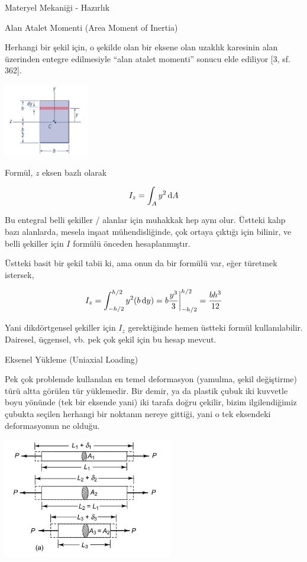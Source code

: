 \documentclass[12pt,fleqn]{article}\usepackage{../../common}
\begin{document}
Materyel Mekaniği - Hazırlık

Alan Atalet Momenti (Area Moment of Inertia)

Herhangi bir şekil için, o şekilde olan bir eksene olan uzaklık karesinin alan
üzerinden entegre edilmesiyle ``alan atalet momenti'' sonucu elde ediliyor
[3, sf. 362]. 

\includegraphics[width=10em]{phy_020_strs_00_04.jpg}

Formül, $z$ eksen bazlı olarak

$$
I_z = \int_A y^2 \,\mathrm{d} A
$$

Bu entegral belli şekiller / alanlar için muhakkak hep aynı olur. Üstteki kalıp
bazı alanlarda, mesela inşaat mühendisliğinde, çok ortaya çıktığı için
bilinir, ve belli şekiller için $I$ formülü önceden hesaplanmıştır.

Üstteki basit bir şekil tabii ki, ama onun da bir formülü var, eğer türetmek
istersek,

$$
I_z = \int_{-h/2}^{h/2} y^2 (b \,\mathrm{d} y) = b \frac{y^3}{3} \bigg\vert_{-h/2}^{h/2} =
\frac{b h^3}{12}
$$

Yani dikdörtgensel şekiller için $I_z$ gerektiğinde hemen üstteki formül
kullanılabilir. Dairesel, üçgensel, vb. pek çok şekil için bu hesap mevcut.

Eksenel Yükleme (Uniaxial Loading)

Pek çok problemde kullanılan en temel deformasyon (yamulma, şekil değiştirme)
türü altta görülen tür yüklemedir. Bir demir, ya da plastik çubuk iki kuvvetle
boyu yönünde (tek bir eksende yani) iki tarafa doğru çekilir, bizim
ilgilendiğimiz çubukta seçilen herhangi bir noktanın nereye gittiği, yani o tek
eksendeki deformasyonun ne olduğu.

\includegraphics[width=20em]{phy_020_strs_00_01.jpg}
\end{document}
